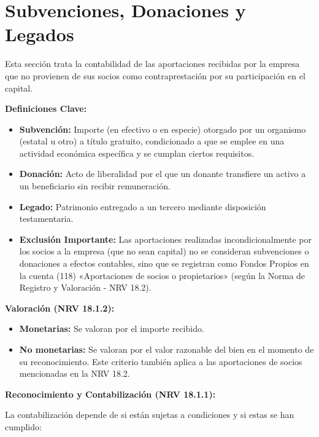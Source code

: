 \documentclass[
  paper=a4,
  ,captions=tableheading
]{scrbook}
\providecommand{\tightlist}{%
  \setlength{\itemsep}{0pt}\setlength{\parskip}{0pt}}
\begin{document}
\hypertarget{subvenciones-donaciones-y-legados}{%
\section{Subvenciones, Donaciones y
Legados}\label{subvenciones-donaciones-y-legados}}

Esta sección trata la contabilidad de las aportaciones recibidas por la
empresa que no provienen de sus socios como contraprestación por su
participación en el capital.

\textbf{Definiciones Clave:}

\begin{itemize}
\tightlist
\item
  \textbf{Subvención:} Importe (en efectivo o en especie) otorgado por
  un organismo (estatal u otro) a título gratuito, condicionado a que se
  emplee en una actividad económica específica y se cumplan ciertos
  requisitos.
\item
  \textbf{Donación:} Acto de liberalidad por el que un donante
  transfiere un activo a un beneficiario sin recibir remuneración.
\item
  \textbf{Legado:} Patrimonio entregado a un tercero mediante
  disposición testamentaria.
\item
  \textbf{Exclusión Importante:} Las aportaciones realizadas
  incondicionalmente por los socios a la empresa (que no sean capital)
  no se consideran subvenciones o donaciones a efectos contables, sino
  que se registran como Fondos Propios en la cuenta (118) «Aportaciones
  de socios o propietarios» (según la Norma de Registro y Valoración -
  NRV 18.2).
\end{itemize}

\textbf{Valoración (NRV 18.1.2):}

\begin{itemize}
\tightlist
\item
  \textbf{Monetarias:} Se valoran por el importe recibido.
\item
  \textbf{No monetarias:} Se valoran por el valor razonable del bien en
  el momento de su reconocimiento. Este criterio también aplica a las
  aportaciones de socios mencionadas en la NRV 18.2.
\end{itemize}

\textbf{Reconocimiento y Contabilización (NRV 18.1.1):}

La contabilización depende de si están sujetas a condiciones y si estas
se han cumplido:
\end{document}
